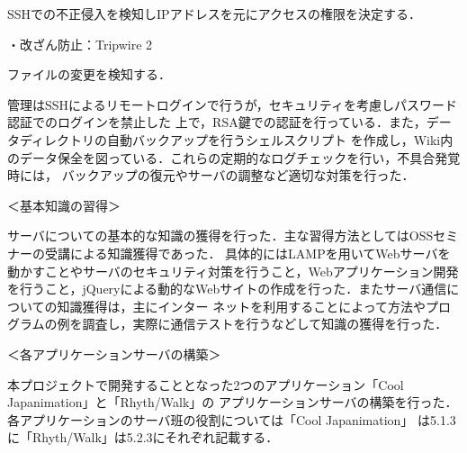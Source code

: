 \par SSHでの不正侵入を検知しIPアドレスを元にアクセスの権限を決定する．
\par ・改ざん防止：Tripwire 2
\par ファイルの変更を検知する．
\\
\par
管理はSSHによるリモートログインで行うが，セキュリティを考慮しパスワード認証でのログインを禁止した
上で，RSA鍵での認証を行っている．また，データディレクトリの自動バックアップを行うシェルスクリプト
を作成し，Wiki内のデータ保全を図っている．これらの定期的なログチェックを行い，不具合発覚時には，
バックアップの復元やサーバの調整など適切な対策を行った．
\\
\par ＜基本知識の習得＞
\par
サーバについての基本的な知識の獲得を行った．主な習得方法としてはOSSセミナーの受講による知識獲得であった．
具体的にはLAMPを用いてWebサーバを動かすことやサーバのセキュリティ対策を行うこと，Webアプリケーション開発
を行うこと，jQueryによる動的なWebサイトの作成を行った．またサーバ通信についての知識獲得は，主にインター
ネットを利用することによって方法やプログラムの例を調査し，実際に通信テストを行うなどして知識の獲得を行った．
\\
\par ＜各アプリケーションサーバの構築＞
\par
本プロジェクトで開発することとなった2つのアプリケーション「Cool Japanimation」と「Rhyth/Walk」の
アプリケーションサーバの構築を行った．各アプリケーションのサーバ班の役割については「Cool Japanimation」
は5.1.3に「Rhyth/Walk」は5.2.3にそれぞれ記載する．

